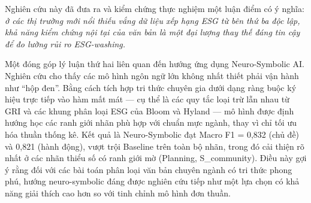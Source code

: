 Nghiên cứu này đã đưa ra và kiểm chứng thực nghiệm một luận điểm có ý nghĩa: \textit{ở các thị trường mới nổi thiếu vắng dữ liệu xếp hạng ESG từ bên thứ ba độc lập, khả năng kiểm chứng nội tại của văn bản là một đại lượng thay thế đáng tin cậy để đo lường rủi ro ESG-washing.}

Một đóng góp lý luận thứ hai liên quan đến hướng ứng dụng Neuro-Symbolic AI. Nghiên cứu cho thấy các mô hình ngôn ngữ lớn không nhất thiết phải vận hành như ``hộp đen''. Bằng cách tích hợp tri thức chuyên gia dưới dạng ràng buộc ký hiệu trực tiếp vào hàm mất mát --- cụ thể là các quy tắc loại trừ lẫn nhau từ GRI và các khung phân loại ESG của Bloom và Hyland --- mô hình được định hướng học các ranh giới nhãn phù hợp với chuẩn mực ngành, thay vì chỉ tối ưu hóa thuần thống kê. Kết quả là Neuro-Symbolic đạt Macro F1 = 0,832 (chủ đề) và 0,821 (hành động), vượt trội Baseline trên toàn bộ nhãn, trong đó cải thiện rõ nhất ở các nhãn thiểu số có ranh giới mờ (Planning, S\_community). Điều này gợi ý rằng đối với các bài toán phân loại văn bản chuyên ngành có tri thức phong phú, hướng neuro-symbolic đáng được nghiên cứu tiếp như một lựa chọn có khả năng giải thích cao hơn so với tinh chỉnh mô hình đơn thuần.